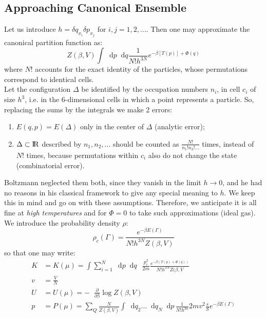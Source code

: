 \documentclass{article}
\newcommand*\diff{\mathop{}\!\mathrm{d}}
\newcommand*\kin{\mathop{}\! \frac{p_i^2}{2m} }
\newcommand*\derbeta[1]{\mathop{}\!\frac{\partial #1}{\partial \mathrm{\beta}} }
\begin{document}
\subsection{Approaching Canonical Ensemble}
Let us introduce $h = \delta q_{x_i} \delta p_{x_j}$ for $i,j = 1,2,...$. Then one may approximate the canonical partition function as:
\begin{equation}
    Z(\beta,V) \int \diff{p}\diff{q}    \frac{1}{N! h^{3N}}e^{-\beta [T(p)]+\Phi(q)}
\end{equation}
where $N!$ accounts for the exact identity of the particles, whose permutations correspond to identical cells. \\
Let the configuration $\Delta$ be identified by the occupation numbers $n_i$, in cell $c_i $ of size $h^3$, i.e. in the 6-dimensional cells in which a point represents a particle. So, replacing the sums by the integrals we make 2 errors:
\begin{enumerate}
    \item $E(q,p) = E(\Delta) $ only in the center of $\Delta$ (analytic error);
    \item $\Delta \subset \rm I\!R$ described by $n_1,n_2,...$ should be counted as $\frac{N!}{n_1!n_2!...}$ times, instead of $N!$ times, because permutations within $c_i$ also do not change the state (combinatorial error).
\end{enumerate}
Boltzmann neglected them both, since they vanish in the limit $h \xrightarrow{} 0 $, and he had no reasons in his classical framework to give any special meaning to $h$. We keep this in mind and go on with these assumptions. Therefore, we anticipate it is all fine at \textit{high temperatures} and for $\Phi = 0$ to take such approximations (ideal gas). We introduce the probability density $\rho$:
$$\rho_c(\Gamma)  = \frac{e^{-\beta E(\Gamma)} }{N! h^{3N} Z(\beta,V)}$$
so that one may write:
\begin{equation*}
    \begin{aligned}
    K &= K(\mu) = \int \sum_{i=1}^N \diff{p} \diff{q} \, \kin \frac{e^{-\beta(T(p) +\Phi(q))}}{N! h^{3N} Z(\beta,V} \\
    v &= \frac{V}{N}\\
    U &= U(\mu) = - \derbeta{} \log Z(\beta,V) \\
    p &= P(\mu) = \sum_Q \frac{N}{Z(\beta,V)} \int \diff{q_2}...\diff{q_N}\diff{p} \, \frac{1}{N!h^{3n} } 2m v^2\frac{s}{S} e^{-\beta E(\Gamma)}\\
    \end{aligned}
\end{equation*}
\end{document}
